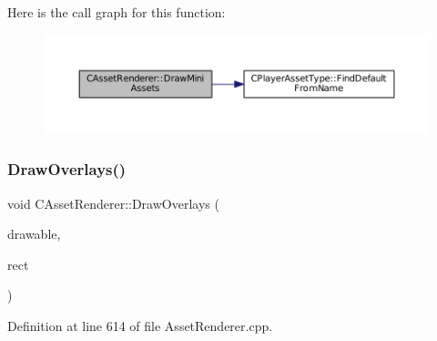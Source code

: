 Here is the call graph for this function\+:\nopagebreak
\begin{figure}[H]
\begin{center}
\leavevmode
\includegraphics[width=350pt]{classCAssetRenderer_aeae64eefc83960997f372880140aaaa5_cgraph}
\end{center}
\end{figure}
\hypertarget{classCAssetRenderer_a1d2941f9b7aa116f578642c62410bb4a}{}\label{classCAssetRenderer_a1d2941f9b7aa116f578642c62410bb4a} 
\subsubsection{\texorpdfstring{Draw\+Overlays()}{DrawOverlays()}}
{\footnotesize\ttfamily void C\+Asset\+Renderer\+::\+Draw\+Overlays (\begin{DoxyParamCaption}\item[{Gdk\+Drawable $\ast$}]{drawable,  }\item[{const \hyperlink{structSRectangle}{S\+Rectangle} \&}]{rect }\end{DoxyParamCaption})}



Definition at line 614 of file Asset\+Renderer.\+cpp.


